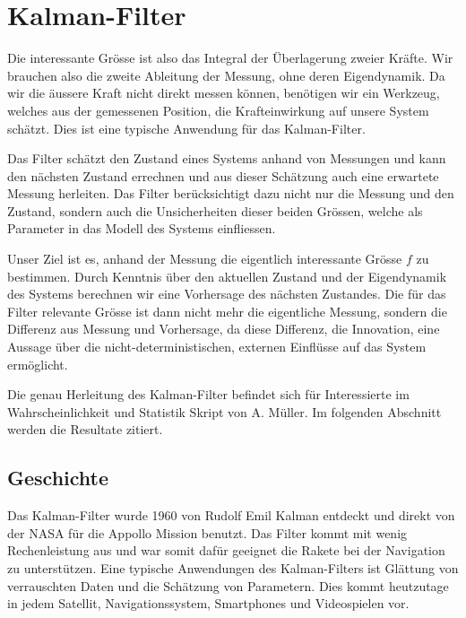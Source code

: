 %
%
%
%
%




\section{Kalman-Filter}
Die interessante Grösse ist also das Integral der Überlagerung zweier Kräfte. 
Wir brauchen also die zweite Ableitung der Messung, ohne deren Eigendynamik.
Da wir die äussere Kraft nicht direkt messen können, benötigen wir ein Werkzeug, welches aus der gemessenen Position, die Krafteinwirkung auf unsere System schätzt. 
Dies ist eine typische Anwendung für das Kalman-Filter.

Das Filter schätzt den Zustand eines Systems anhand von Messungen und kann den nächsten Zustand errechnen und aus dieser Schätzung auch eine erwartete Messung herleiten.
Das Filter berücksichtigt dazu nicht nur die Messung und den Zustand, sondern auch die Unsicherheiten dieser beiden Grössen, welche als Parameter in das Modell des Systems einfliessen.

Unser Ziel ist es, anhand der Messung die eigentlich interessante Grösse $f$ zu bestimmen. 
Durch Kenntnis über den aktuellen Zustand und der Eigendynamik des Systems berechnen wir eine Vorhersage des nächsten Zustandes.
Die für das Filter relevante Grösse ist dann nicht mehr die eigentliche Messung, sondern die Differenz aus Messung und Vorhersage, da diese Differenz, die Innovation, eine Aussage über die nicht-deterministischen, externen Einflüsse auf das System ermöglicht.

Die genau Herleitung des Kalman-Filter befindet sich für Interessierte im Wahrscheinlichkeit und Statistik Skript von A. Müller. 
Im folgenden Abschnitt werden die Resultate zitiert. 

\subsection{Geschichte}
Das Kalman-Filter wurde 1960 von Rudolf Emil Kalman entdeckt und direkt von der NASA für die Appollo Mission benutzt.
Das Filter kommt mit wenig Rechenleistung aus und war somit dafür geeignet die Rakete bei der Navigation zu unterstützen. 
Eine typische Anwendungen des Kalman-Filters ist Glättung von verrauschten Daten und die Schätzung von Parametern. Dies kommt heutzutage in jedem Satellit, Navigationssystem, Smartphones und Videospielen vor.

